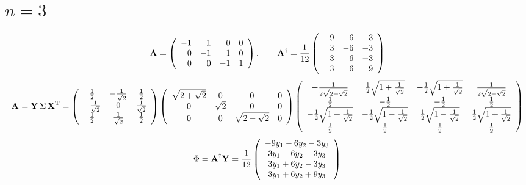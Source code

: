 \documentclass[10pt]{article}
\begin{document}
\section{$n=3$}
\begin{equation}
    \A{}=
\left(
\begin{array}{rrrr}
 -1 & 1 & 0 & 0 \\
 0 & -1 & 1 & 0 \\
 0 & 0 & -1 & 1
\end{array}
\right), \qquad
    \A{\dagger}=\frac{1}{12}
\left(
\begin{array}{rrr}
 -9 & -6 & -3 \\
 3 & -6 & -3 \\
 3 & 6 & -3 \\
 3 & 6 & 9
\end{array}
\right)
\end{equation}
\begin{equation}
  \A{}=\Y{}\,\Sigma\,\X{T} =
\left(
\begin{array}{ccc}
 \frac{1}{2} & -\frac{1}{\sqrt{2}} & \frac{1}{2} \\
 -\frac{1}{\sqrt{2}} & 0 & \frac{1}{\sqrt{2}} \\
 \frac{1}{2} & \frac{1}{\sqrt{2}} & \frac{1}{2}
\end{array}
\right)
\left(
\begin{array}{cccc}
 \sqrt{2+\sqrt{2}} & 0 & 0 & 0 \\
 0 & \sqrt{2} & 0 & 0 \\
 0 & 0 & \sqrt{2-\sqrt{2}} & 0
\end{array}
\right)
\left(
\begin{array}{cccc}
 -\frac{1}{2 \sqrt{2+\sqrt{2}}} & \frac{1}{2} \sqrt{1+\frac{1}{\sqrt{2}}} & -\frac{1}{2} \sqrt{1+\frac{1}{\sqrt{2}}} & \frac{1}{2 \sqrt{2+\sqrt{2}}} \\
 \frac{1}{2} & -\frac{1}{2} & -\frac{1}{2} & \frac{1}{2} \\
 -\frac{1}{2} \sqrt{1+\frac{1}{\sqrt{2}}} & -\frac{1}{2} \sqrt{1-\frac{1}{\sqrt{2}}} & \frac{1}{2} \sqrt{1-\frac{1}{\sqrt{2}}} & \frac{1}{2} \sqrt{1+\frac{1}{\sqrt{2}}} \\
 \frac{1}{2} & \frac{1}{2} & \frac{1}{2} & \frac{1}{2}
\end{array}
\right)
\end{equation}
\begin{equation}
  \Phi=\A{\dagger}\Y{}=\frac{1}{12}
\mat{c}{-9 y_1-6 y_2-3 y_3\\3 y_1-6 y_2-3 y_3\\3 y_1+6 y_2-3 y_3\\3 y_1+6 y_2+9 y_3}
\end{equation}
\end{document}
